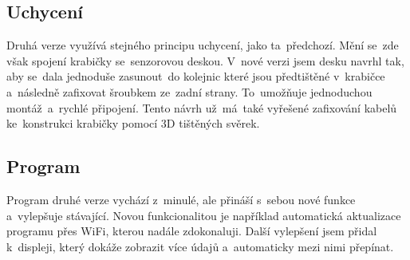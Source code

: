 \subsection{Uchycení}
Druhá verze využívá stejného principu uchycení, jako ta~předchozí. 
Mění se~zde však spojení krabičky se~senzorovou deskou. 
V~nové verzi jsem desku navrhl tak, aby se~dala jednoduše zasunout~do kolejnic které jsou předtištěné v~krabičce a~následně zafixovat šroubkem ze~zadní strany.
To~umožňuje jednoduchou montáž~a~rychlé připojení.
Tento návrh už~má~také vyřešené zafixování kabelů ke~konstrukci krabičky pomocí 3D tištěných svěrek.


\subsection{Program}
Program druhé verze vychází z~minulé, ale přináší s~sebou nové funkce a~vylepšuje stávající.
Novou funkcionalitou je například automatická aktualizace programu přes WiFi, kterou nadále zdokonaluji.
Další vylepšení jsem přidal k~displeji, který dokáže zobrazit více údajů a~automaticky mezi nimi přepínat.

